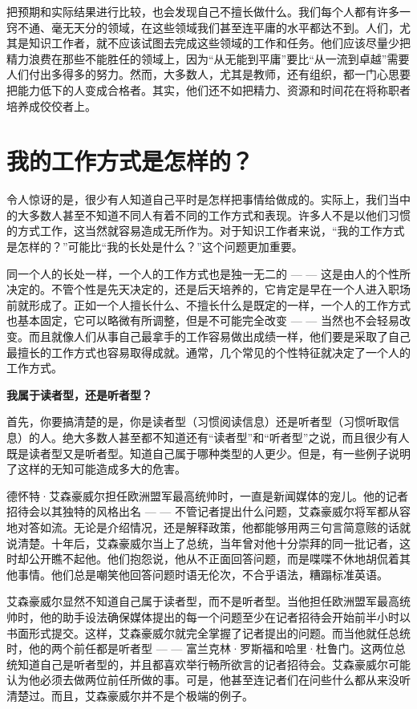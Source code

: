 \documentclass[a4paper,12pt,lang=cn,fontset = windows]{elegantpaper} %
\begin{document}
把预期和实际结果进行比较，也会发现自己不擅长做什么。我们每个人都有许多一窍不通、毫无天分的领域，在这些领域我们甚至连平庸的水平都达不到。人们，尤其是知识工作者，就不应该试图去完成这些领域的工作和任务。他们应该尽量少把精力浪费在那些不能胜任的领域上，因为“从无能到平庸”要比“从一流到卓越”需要人们付出多得多的努力。然而，大多数人，尤其是教师，还有组织，都一门心思要把能力低下的人变成合格者。其实，他们还不如把精力、资源和时间花在将称职者培养成佼佼者上。

\section{我的工作方式是怎样的？}
令人惊讶的是，很少有人知道自己平时是怎样把事情给做成的。实际上，我们当中的大多数人甚至不知道不同人有着不同的工作方式和表现。许多人不是以他们习惯的方式工作，这当然就容易造成无所作为。对于知识工作者来说，“我的工作方式是怎样的？”可能比“我的长处是什么？”这个问题更加重要。

同一个人的长处一样，一个人的工作方式也是独一无二的 — — 这是由人的个性所决定的。不管个性是先天决定的，还是后天培养的，它肯定是早在一个人进入职场前就形成了。正如一个人擅长什么、不擅长什么是既定的一样，一个人的工作方式也基本固定，它可以略微有所调整，但是不可能完全改变 — — 当然也不会轻易改变。而且就像人们从事自己最拿手的工作容易做出成绩一样，他们要是采取了自己最擅长的工作方式也容易取得成就。通常，几个常见的个性特征就决定了一个人的工作方式。

\textbf{我属于读者型，还是听者型？}

首先，你要搞清楚的是，你是读者型（习惯阅读信息）还是听者型（习惯听取信息）的人。绝大多数人甚至都不知道还有“读者型”和“听者型”之说，而且很少有人既是读者型又是听者型。知道自己属于哪种类型的人更少。但是，有一些例子说明了这样的无知可能造成多大的危害。

德怀特·艾森豪威尔担任欧洲盟军最高统帅时，一直是新闻媒体的宠儿。他的记者招待会以其独特的风格出名 — — 不管记者提出什么问题，艾森豪威尔将军都从容地对答如流。无论是介绍情况，还是解释政策，他都能够用两三句言简意赅的话就说清楚。十年后，艾森豪威尔当上了总统，当年曾对他十分崇拜的同一批记者，这时却公开瞧不起他。他们抱怨说，他从不正面回答问题，而是喋喋不休地胡侃着其他事情。他们总是嘲笑他回答问题时语无伦次，不合乎语法，糟蹋标准英语。

艾森豪威尔显然不知道自己属于读者型，而不是听者型。当他担任欧洲盟军最高统帅时，他的助手设法确保媒体提出的每一个问题至少在记者招待会开始前半小时以书面形式提交。这样，艾森豪威尔就完全掌握了记者提出的问题。而当他就任总统时，他的两个前任都是听者型 — — 富兰克林·罗斯福和哈里·杜鲁门。这两位总统知道自己是听者型的，并且都喜欢举行畅所欲言的记者招待会。艾森豪威尔可能认为他必须去做两位前任所做的事。可是，他甚至连记者们在问些什么都从来没听清楚过。而且，艾森豪威尔并不是个极端的例子。
\end{document}
